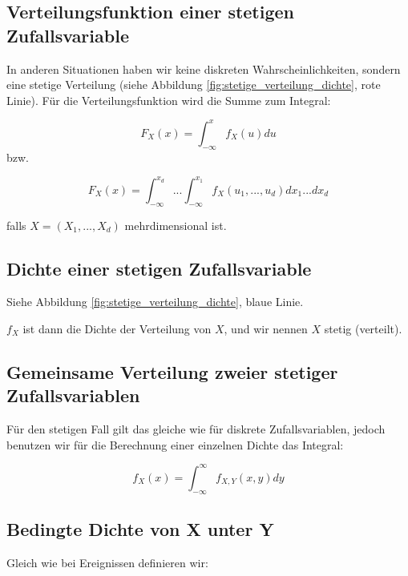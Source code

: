 {    \subsection{Verteilungsfunktion einer stetigen Zufallsvariable}

    In anderen Situationen haben wir keine diskreten Wahrscheinlichkeiten, sondern eine stetige Verteilung (siehe Abbildung \ref{fig:stetige_verteilung_dichte}, rote Linie). Für die Verteilungsfunktion wird die Summe zum Integral:

    \[
        F_{X}\left(x\right)=\int_{-{\infty}}^{x}{f_{X}(u)}du
    \]
    bzw.

    \begin{equation*}
    F_{X}\left(x\right)=\int_{-\infty}^{x_d}{... \int_{-\infty}^{x_1}{f_{X}\left(u_{1},... ,u_{d}\right)}dx_{1}... }dx_{d}
    \end{equation*}

    falls $X=\left(X_{1},...,X_{d}\right)$ mehrdimensional ist.

     \subsection{Dichte einer stetigen Zufallsvariable}
    Siehe Abbildung \ref{fig:stetige_verteilung_dichte}, blaue Linie.

     $f_{X}$ ist dann die Dichte der Verteilung von $X$, und wir nennen $X$ stetig (verteilt).


     \subsection{Gemeinsame Verteilung zweier stetiger Zufallsvariablen}
    Für den stetigen Fall gilt das gleiche wie für diskrete Zufallsvariablen, jedoch
    benutzen wir für die Berechnung einer einzelnen Dichte das Integral:

    \[
    f_{X}\left(x\right)=\int_{-{\infty}}^{{\infty}}{f_{X,Y}\left(x,y\right)}dy
    \]
    \subsection{Bedingte Dichte von X unter Y}

    \begin{definition}
        Gleich wie bei Ereignissen definieren wir:


\end{definition}}
